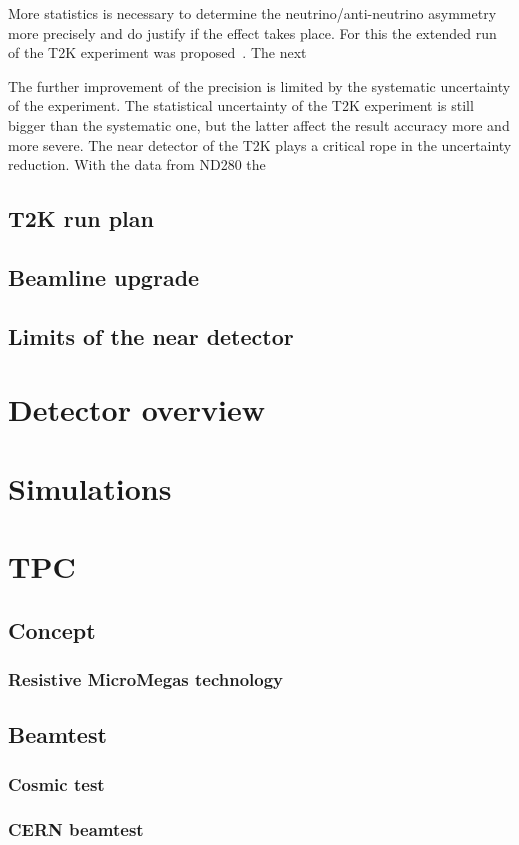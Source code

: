 \documentclass[../main.tex]{subfiles}
\begin{document}
More statistics is necessary to determine the neutrino/anti-neutrino asymmetry more precisely and do justify if the effect takes place. For this the extended run of the T2K experiment was proposed~\cite{Abe2016e}. The next


The further improvement of the precision is limited by the systematic uncertainty of the experiment. The statistical uncertainty of the T2K experiment is still bigger than the systematic one, but the latter affect the result accuracy more and more severe. The near detector of the T2K plays a critical rope in the uncertainty reduction. With the data from ND280 the

\section{T2K run plan}
\section{Beamline upgrade}
\section{Limits of the near detector}
\chapter{Detector overview}
\chapter{Simulations}

\chapter{TPC}
\section{Concept}
\subsection{Resistive MicroMegas technology}
\section{Beamtest}
\subsection{Cosmic test}
\subsection{CERN beamtest}
\end{document}
